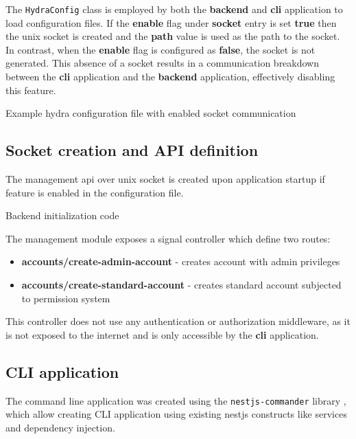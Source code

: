 \documentclass[../main.tex]{subfiles}
\begin{document}
The \texttt{HydraConfig} class is employed by both the \textbf{backend} and \textbf{cli} application to load configuration files.
If the \textbf{enable} flag under \textbf{socket} entry is set \textbf{true} then the unix socket is created and the \textbf{path} value is used as the path to the socket.
In contrast, when the \textbf{enable} flag is configured as \textbf{false}, the socket is not generated.
This absence of a socket results in a communication breakdown between the \textbf{cli} application and the \textbf{backend} application, effectively disabling this feature.

\begin{listing}[H]
  \caption{Example hydra configuration file with enabled socket communication}
\end{listing}

\subsection{Socket creation and API definition}

The management api over unix socket is created upon application startup if feature is enabled in the configuration file.

\begin{listing}[H]
  \caption{Backend initialization code}
\end{listing}

The management module exposes a signal controller which define two routes:

\begin{itemize}
  \item \textbf{accounts/create-admin-account} - creates account with admin privileges
  \item \textbf{accounts/create-standard-account} - creates standard account subjected to permission system
\end{itemize}

This controller does not use any authentication or authorization middleware, as it is not exposed to the internet and is only accessible by the \textbf{cli} application.

\subsection{CLI application}

The command line application was created using the \texttt{nestjs-commander} library \cite{nestjs-commander}, which allow creating CLI application using
existing nestjs constructs like services and dependency injection.
\end{document}
